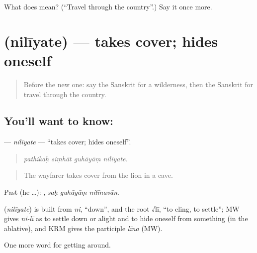 \begin{tcolorbox}[breakable,colback=teal!4,colframe=teal!35!black,title={Before you move on}]
What does  mean? (\textquotedblleft{}Travel through the country\textquotedblright{}.) Say it once more.
\end{tcolorbox}
\section[\texorpdfstring{\sk{निलीयते} (nilīyate)}{निलीयते (nilīyate)}]{ (nilīyate) — takes cover; hides oneself}

\label{lesson:SA-C404-niliyate}



\begin{quote}
Before the new one: say the Sanskrit for a wilderness, then the Sanskrit for travel through the country.
\end{quote}

\subsection*{You'll want to know: }
\textbf{} — \emph{nilīyate} — \textquotedblleft{}takes cover; hides oneself\textquotedblright{}.

\begin{quote}
   
\end{quote}

\begin{quote}
\emph{pathikaḥ siṃhāt guhāyāṃ nilīyate.}
\end{quote}

\begin{quote}
The wayfarer takes cover from the lion in a cave.
\end{quote}

Past (he …):   , \emph{saḥ guhāyāṃ nilīnavān}.

\begin{cousinweb}
\textbf{} (\emph{nilīyate}) is built from \emph{ni}, \textquotedblleft{}down\textquotedblright{}, and the root √lī, \textquotedblleft{}to cling, to settle\textquotedblright{}; MW gives \emph{ni-lī} as to settle down or alight and to hide oneself from something (in the ablative), and KRM gives the participle \emph{līna} (MW).
\end{cousinweb}

\begin{grammarlens}[title={What you've built}]
One more word for getting around.
\end{grammarlens}

